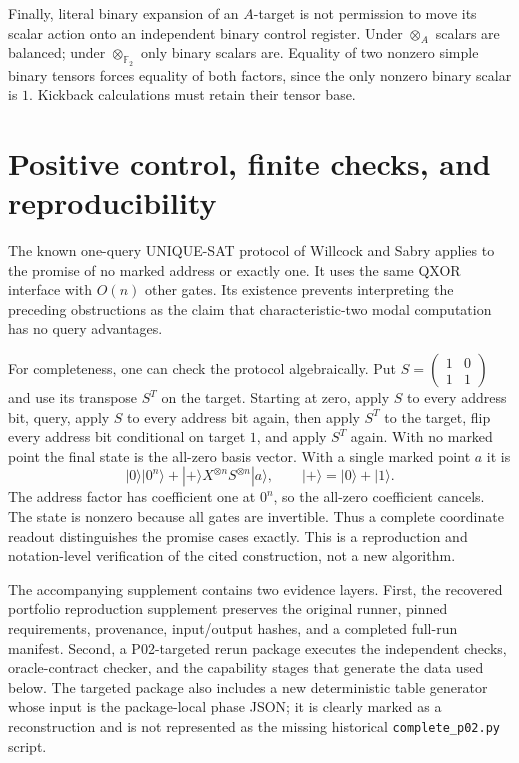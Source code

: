 \documentclass[11pt]{article}
\newcommand{\F}{\mathbb F}
\begin{document}
Finally, literal binary expansion of an $A$-target is not permission to move its scalar action onto an independent binary control register. Under $\otimes_A$ scalars are balanced; under $\otimes_{\F_2}$ only binary scalars are. Equality of two nonzero simple binary tensors forces equality of both factors, since the only nonzero binary scalar is $1$. Kickback calculations must retain their tensor base.

\section{Positive control, finite checks, and reproducibility}\label{sec:checks}
The known one-query UNIQUE-SAT protocol of Willcock and Sabry \cite{WillcockSabry2011} applies to the promise of no marked address or exactly one. It uses the same QXOR interface with $O(n)$ other gates. Its existence prevents interpreting the preceding obstructions as the claim that characteristic-two modal computation has no query advantages.

For completeness, one can check the protocol algebraically. Put $S=\left(\begin{smallmatrix}1&0\\1&1\end{smallmatrix}\right)$ and use its transpose $S^T$ on the target. Starting at zero, apply $S$ to every address bit, query, apply $S$ to every address bit again, then apply $S^T$ to the target, flip every address bit conditional on target $1$, and apply $S^T$ again. With no marked point the final state is the all-zero basis vector. With a single marked point $a$ it is
\[
 |0\rangle|0^n\rangle+|+\rangle X^{\otimes n}S^{\otimes n}|a\rangle,
 \qquad |+\rangle=|0\rangle+|1\rangle.
\]
The address factor has coefficient one at $0^n$, so the all-zero coefficient cancels. The state is nonzero because all gates are invertible. Thus a complete coordinate readout distinguishes the promise cases exactly. This is a reproduction and notation-level verification of the cited construction, not a new algorithm.

The accompanying supplement contains two evidence layers. First, the recovered portfolio reproduction supplement preserves the original runner, pinned requirements, provenance, input/output hashes, and a completed full-run manifest. Second, a P02-targeted rerun package executes the independent checks, oracle-contract checker, and the capability stages that generate the data used below. The targeted package also includes a new deterministic table generator whose input is the package-local phase JSON; it is clearly marked as a reconstruction and is not represented as the missing historical \texttt{complete\_p02.py} script.
\end{document}
